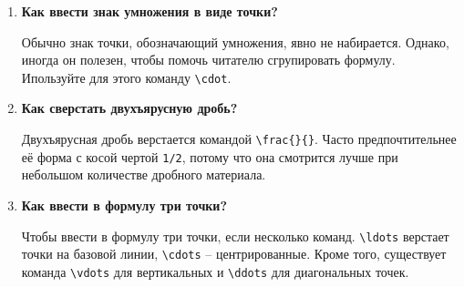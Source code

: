 \documentclass[a4paper,12pt]{article} %
\begin{document}
\begin{enumerate}
\item \large \textbf{Как ввести знак умножения в виде точки?}

\normalsize Обычно знак точки, обозначающий умножения, явно не набирается. Однако, иногда он полезен, чтобы помочь читателю сгрупировать формулу. Ипользуйте для этого команду \verb|\cdot|.

\item \large \textbf{Как сверстать двухъярусную дробь?}

\normalsize Двухъярусная дробь верстается командой \verb|\frac{}{}|. Часто предпочтительнее её форма с косой чертой \verb|1/2|, потому что она смотрится лучше при небольшом количестве дробного материала.

\item \large \textbf{Как ввести в формулу три точки?}

\normalsize Чтобы ввести в формулу три точки, если несколько команд. \verb|\ldots| верстает точки на базовой линии, \verb|\cdots| -- центрированные. Кроме того, существует команда \verb|\vdots| для вертикальных и \verb|\ddots| для диагональных точек.

\end{enumerate}
\end{document}
